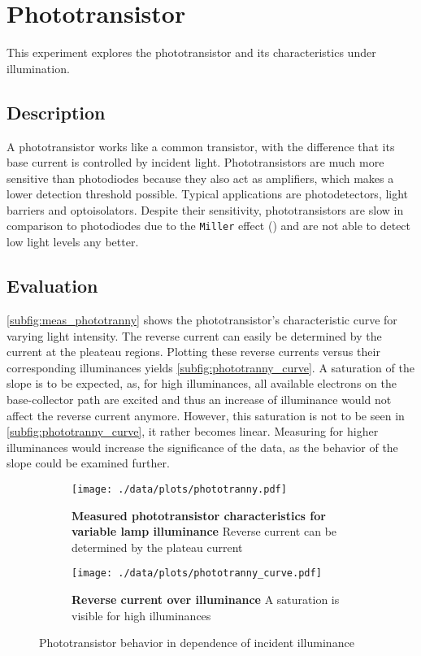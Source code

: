 \chapter{Phototransistor}
This experiment explores the phototransistor and its characteristics under illumination.

\section{Description}
A phototransistor works like a common transistor, with the difference that its base current is controlled by incident light.
Phototransistors are much more sensitive than photodiodes because they also act as amplifiers, which makes a lower detection threshold possible.
Typical applications are photodetectors, light barriers and optoisolators.
Despite their sensitivity, phototransistors are slow in comparison to photodiodes due to the \texttt{Miller} effect (\cite{miller}) and are not able to detect low light levels any better.

\section{Evaluation}
\autoref{subfig:meas_phototranny} shows the phototransistor's characteristic curve for varying light intensity.
The reverse current can easily be determined by the current at the pleateau regions.
Plotting these reverse currents versus their corresponding illuminances yields \autoref{subfig:phototranny_curve}.
A saturation of the slope is to be expected, as, for high illuminances, all available electrons on the base-collector path are excited and thus an increase of illuminance would not affect the reverse current anymore.
However, this saturation is not to be seen in \autoref{subfig:phototranny_curve}, it rather becomes linear.
Measuring for higher illuminances would increase the significance of the data, as the behavior of the slope could be examined further.

\begin{figure}[btp]
	\centering
	\begin{subfigure}{0.4\textwidth}
		\centering
		\texttt{[image: ./data/plots/phototranny.pdf]}
		\caption[Measured phototransistor characteristics for variable lamp illuminance]{\textbf{Measured phototransistor characteristics for variable lamp illuminance} Reverse current can be determined by the plateau current}
		\label{subfig:meas_phototranny}
	\end{subfigure}\quad
	\begin{subfigure}{0.4\textwidth}
		\centering
		\texttt{[image: ./data/plots/phototranny\_curve.pdf]}
		\caption[Reverse current over illuminance]{\textbf{Reverse current over illuminance} A saturation is visible for high illuminances}
		\label{subfig:phototranny_curve}
	\end{subfigure}
	\caption{Phototransistor behavior in dependence of incident illuminance}
\end{figure}
